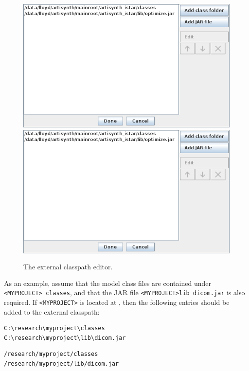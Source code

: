 \begin{figure}[h]
\begin{center}
\iflatexml
\includegraphics[]{images/externalClasspathEditor}
\else
\includegraphics[width=5in]{images/externalClasspathEditor}
\fi
\end{center}
\caption{The external classpath editor.}%
\label{externalClasspathEditor:fig}
\end{figure}

As an example, assume that
the model class files are contained under {\tt <MYPROJECT>\SEP
classes}, and that the JAR file {\tt <MYPROJECT>\SEP lib\SEP
dicom.jar} is also required.  If {\tt <MYPROJECT>} is located
at %
%
\fi , then the following entries should be added to
the external classpath:
\ifWindows
\begin{verbatim}
C:\research\myproject\classes
C:\research\myproject\lib\dicom.jar
\end{verbatim}
\else %
\begin{verbatim}
/research/myproject/classes
/research/myproject/lib/dicom.jar
\end{verbatim}
\fi %

